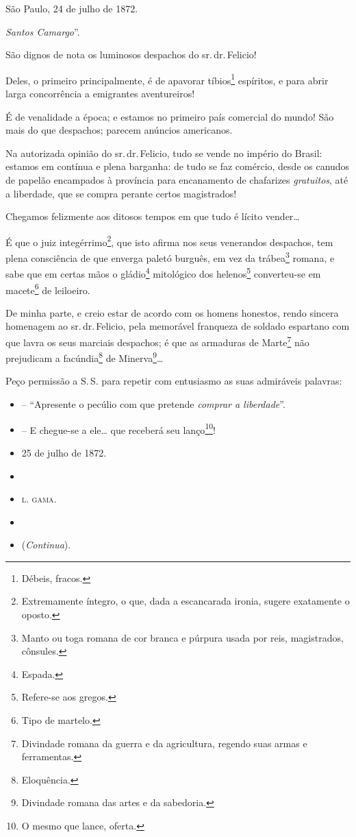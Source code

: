 São Paulo, 24 de julho de 1872.

\emph{Santos Camargo}''.

São dignos de nota os luminosos despachos do sr.\,dr.\,Felicio!

Deles, o primeiro principalmente, é de apavorar tíbios\footnote{
  Débeis, fracos.} espíritos, e para abrir larga concorrência a
emigrantes aventureiros!

É de venalidade a época; e estamos no primeiro país comercial do mundo!
São mais do que despachos; parecem anúncios americanos.

Na autorizada opinião do sr.\,dr.\,Felicio, tudo se vende no império do
Brasil: estamos em contínua e plena barganha: de tudo se faz comércio,
desde os canudos de papelão encampados à província para encanamento de
chafarizes \emph{gratuitos}, até a liberdade, que se compra perante
certos magistrados!

Chegamos felizmente aos ditosos tempos em que tudo é lícito vender\ldots{}

É que o juiz integérrimo\footnote{ Extremamente íntegro, o que, dada a
  escancarada ironia, sugere exatamente o oposto.}, que isto afirma nos
seus venerandos despachos, tem plena consciência de que enverga paletó
burguês, em vez da trábea\footnote{ Manto ou toga romana de cor branca
  e púrpura usada por reis, magistrados, cônsules.} romana, e sabe que
em certas mãos o gládio\footnote{ Espada.} mitológico dos
helenos\footnote{ Refere-se aos gregos.} converteu-se em
macete\footnote{ Tipo de martelo.} de leiloeiro.

De minha parte, e creio estar de acordo com os homens honestos, rendo
sincera homenagem ao sr.\,dr.\,Felicio, pela memorável franqueza de
soldado espartano com que lavra os seus marciais despachos; é que as
armaduras de Marte\footnote{ Divindade romana da guerra e da
  agricultura, regendo suas armas e ferramentas.} não prejudicam a
facúndia\footnote{ Eloquência.} de Minerva\footnote{ Divindade romana
  das artes e da sabedoria.}\ldots{}

Peço permissão a S.\,S. para repetir com entusiasmo as suas admiráveis
palavras:

\begin{itemize}
\item
  -- ``Apresente o pecúlio com que pretende \emph{comprar a liberdade}''.
\item
  -- E chegue-se a ele\ldots{} que receberá seu lanço\footnote{ O mesmo que
    lance, oferta.}!
\item
  25 de julho de 1872.
\item
\item
 \textsc{l. gama}.
\item
\item
  (\emph{Continua}).
\end{itemize}


